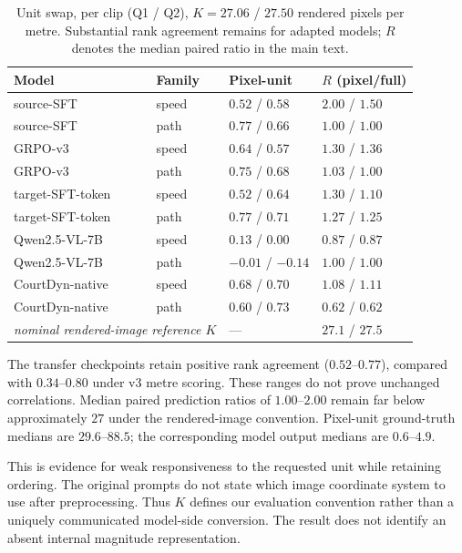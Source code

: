 \begin{table}[t]
\centering
\caption{Unit swap, per clip (Q1 / Q2), $K = 27.06$ / $27.50$ rendered pixels
  per metre. Substantial rank agreement remains for adapted models; $R$ denotes the
  median paired ratio in the main text.}
\label{tab:unitswap}
\small
\begin{tabular}{llll}
\toprule
Model & Family & Pixel-unit \rhosp{} & $R$ (pixel/full) \\
\midrule
source-SFT        & speed & $0.52$ / $0.58$ & $2.00$ / $1.50$ \\
source-SFT        & path  & $0.77$ / $0.66$ & $1.00$ / $1.00$ \\
GRPO-v3           & speed & $0.64$ / $0.57$ & $1.30$ / $1.36$ \\
GRPO-v3           & path  & $0.75$ / $0.68$ & $1.03$ / $1.00$ \\
target-SFT-token  & speed & $0.52$ / $0.64$ & $1.30$ / $1.10$ \\
target-SFT-token  & path  & $0.77$ / $0.71$ & $1.27$ / $1.25$ \\
\midrule
Qwen2.5-VL-7B     & speed & $0.13$ / $0.00$ & $0.87$ / $0.87$ \\
Qwen2.5-VL-7B     & path  & $-0.01$ / $-0.14$ & $1.00$ / $1.00$ \\
\midrule
CourtDyn-native   & speed & $0.68$ / $0.70$ & $1.08$ / $1.11$ \\
CourtDyn-native   & path  & $0.60$ / $0.73$ & $0.62$ / $0.62$ \\
\midrule
\multicolumn{2}{l}{\emph{nominal rendered-image reference $K$}} & --- & $27.1$ / $27.5$ \\
\bottomrule
\end{tabular}
\end{table}

The transfer checkpoints retain positive rank agreement ($0.52$--$0.77$),
compared with $0.34$--$0.80$ under v3 metre scoring. These ranges do not prove
unchanged correlations. Median paired prediction ratios of $1.00$--$2.00$
remain far below approximately $27$ under the rendered-image convention.
Pixel-unit ground-truth medians are $29.6$--$88.5$; the corresponding model
output medians are $0.6$--$4.9$.

This is evidence for weak responsiveness to the requested unit while retaining
ordering. The original prompts do not state which image coordinate system to
use after preprocessing. Thus $K$ defines our evaluation convention rather
than a uniquely communicated model-side conversion. The result does not
identify an absent internal magnitude representation.

